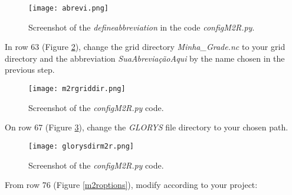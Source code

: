 \begin{figure}[H]
    \centering
    \texttt{[image: abrevi.png]}
    \caption{Screenshot of the \textit{defineabbreviation} in the code \textit{configM2R.py}.}
    \label{abrev}
\end{figure}
\bigskip

\noindent In row 63 (Figure \textcolor{bleu_cite}{\ref{gradediretoriom2r}}), change the grid directory \textit{Minha\_Grade.nc} to your 
grid directory and the abbreviation \textit{SuaAbreviaçãoAqui} by the name chosen in the previous step.
\bigskip

\begin{figure}[H]
    \centering
    \texttt{[image: m2rgriddir.png]}
    \caption{Screenshot of the \textit{configM2R.py} code.
    }
    \label{gradediretoriom2r}
\end{figure}
\bigskip

\noindent On row 67 (Figure \textcolor{bleu_cite}{\ref{glorysdirm2r}}), change the \textit{GLORYS} file directory to your chosen path.
\bigskip

\begin{figure}[H]
    \centering
    \texttt{[image: glorysdirm2r.png]}
    \caption{Screenshot of the \textit{configM2R.py} code.}
    \label{glorysdirm2r}
\end{figure}
\bigskip

\noindent From row 76 (Figure \textcolor{bleu_cite}{\ref{m2roptions}}), modify according to your project: 
\bigskip

